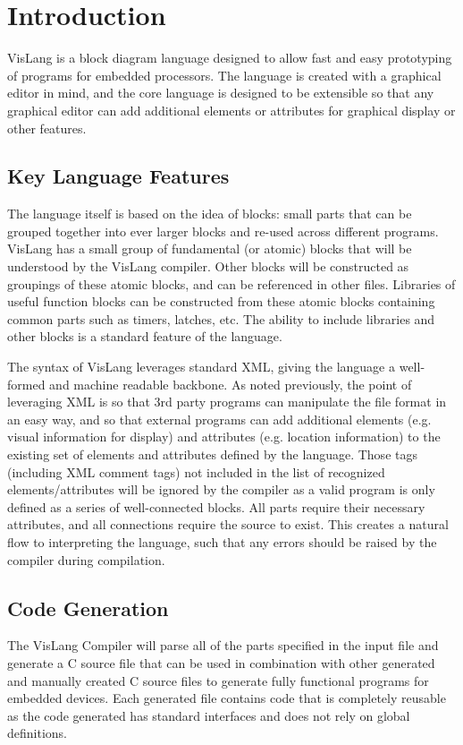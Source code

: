 \section{Introduction}

VisLang is a block diagram language designed to allow fast and
easy prototyping of programs for embedded processors. The language is created
with a graphical editor in mind, and the core language is designed to be extensible
so that any graphical editor can add additional elements or attributes for graphical
display or other features.

\subsection{Key Language Features}

The language itself is based on the idea of blocks: small parts that can be grouped
together into ever larger blocks and re-used across different programs. VisLang has a
small group of fundamental (or atomic) blocks that will be understood by the VisLang
compiler. Other blocks will be constructed as groupings of these atomic blocks, and can
be referenced in other files. Libraries of useful function blocks can be constructed
from these atomic blocks containing common parts such as timers, latches, etc. The 
ability to include libraries and other blocks is a standard feature of the language.

The syntax of VisLang leverages standard XML, giving the language a well-formed and 
machine readable backbone. As noted previously, the point of leveraging XML is so that
3rd party programs can manipulate the file format in an easy way, and so that external
programs can add additional elements (e.g. visual information for display) and attributes
(e.g. location information) to the existing set of elements and attributes defined by
the language. Those tags (including XML comment tags) not included in the list of
recognized elements/attributes will be ignored by the compiler as a valid program is only
defined as a series of well-connected blocks. All parts require their necessary
attributes, and all connections require the source to exist. This creates a natural
flow to interpreting the language, such that any errors should be raised by the compiler
during compilation.

\subsection{Code Generation}

The VisLang Compiler will parse all of the parts specified in the input file and generate
a C source file that can be used in combination with other generated and manually created
C source files to generate fully functional programs for embedded devices. Each generated
file contains code that is completely reusable as the code generated has standard interfaces
and does not rely on global definitions.

